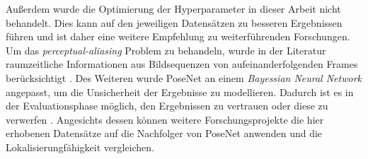 Außerdem wurde die Optimierung der Hyperparameter in dieser Arbeit nicht behandelt. Dies kann auf den jeweiligen Datensätzen zu besseren Ergebnissen führen und ist daher eine weitere Empfehlung zu weiterführenden Forschungen. Um das \textit{perceptual-aliasing} Problem zu behandeln, wurde in der Literatur raumzeitliche Informationen aus Bildsequenzen von aufeinanderfolgenden Frames berücksichtigt \cite{walchImageBasedLocalizationUsing2017, clarkVidLocDeepSpatioTemporal2017}. Des Weiteren wurde PoseNet an einem \textit{Bayessian Neural Network} angepasst, um die Unsicherheit der Ergebnisse zu modellieren. Dadurch ist es in der Evaluationsphase möglich, den Ergebnissen zu vertrauen oder diese zu verwerfen \cite{kendallModellingUncertaintyDeep2016}. Angesichts dessen können weitere Forschungsprojekte die hier erhobenen Datensätze auf die Nachfolger von PoseNet \cite{kendallModellingUncertaintyDeep2016, walchImageBasedLocalizationUsing2017, clarkVidLocDeepSpatioTemporal2017} anwenden und die Lokalisierungfähigkeit vergleichen.
